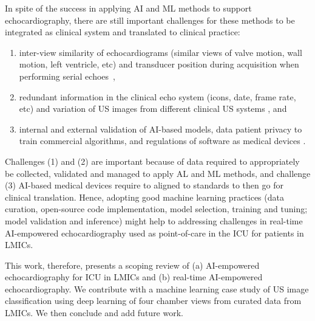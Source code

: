\documentclass[mlabstract,twocolumn]{jmlr}
\begin{document}
In spite of the success in applying AI and ML methods to support echocardiography, there are still important challenges for these methods to be integrated as clinical system and translated to clinical practice:
\begin{enumerate}
\setlength\itemsep{0em}
\item inter-view similarity of echocardiograms (similar views of valve motion, wall motion, left ventricle, etc) and transducer position during acquisition when performing serial echoes~\citep{zhang2018},
\item redundant information in the clinical echo system (icons, date, frame rate, etc) \citep{khamis2017} and variation of US images from different clinical US systems \citep{brindise2020unsupervised}, and
\item internal and external validation of AI-based models, data patient privacy to train commercial algorithms, and regulations of software as medical devices \citep{2022_Stewart_Emergency_Medicine_Australasia}.
\end{enumerate}
Challenges (1) and (2) are important because of data required to appropriately be collected, validated and managed to apply AL and ML methods, and challenge (3) AI-based medical devices require to aligned to standards to then go for clinical translation.
Hence, adopting good machine learning practices (data curation, open-source code implementation, model selection, training and tuning; model validation and inference) might help to addressing challenges in real-time AI-empowered echocardiography used as point-of-care in the ICU for patients in LMICs.

This work, therefore, presents a scoping review of (a) AI-empowered echocardiography for ICU in LMICs and (b) real-time AI-empowered echocardiography.
We contribute with a machine learning case study of US image classification using deep learning of four chamber views from curated data from LMICs.
We then conclude and add future work.
\end{document}
